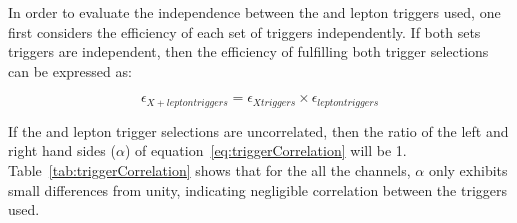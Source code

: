 In order to evaluate the independence between the \MET and lepton triggers used, one first considers the efficiency of each set of triggers independently.
If both sets triggers are independent, then the efficiency of fulfilling both trigger selections can be expressed as:

\begin{equation}
\epsilon_{X + lepton triggers} = \epsilon_{X triggers} \times \epsilon_{lepton triggers}
\label{eq:triggerCorrelation}
\end{equation}

If the \MET and lepton trigger selections are uncorrelated, then the ratio of the left and right hand sides ($\alpha$) of equation~\ref{eq:triggerCorrelation} will be 1.
Table~\ref{tab:triggerCorrelation} shows that for the all the channels, $\alpha$ only exhibits small differences from unity, indicating negligible correlation between the triggers used.

\begin{table}[htbp]
\label{tab:triggerCorrelation}
  \centering
\end{table}

%

